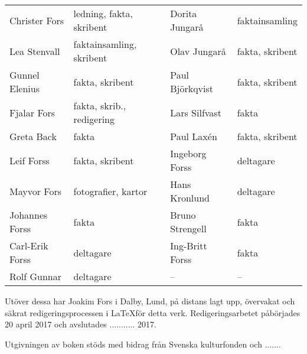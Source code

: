 \begin{center}
  \begin{tabular}{l l l l}
    Christer Fors & ledning, fakta, skribent & Dorita Jungarå & faktainsamling \\
    Lea Stenvall & faktainsamling, skribent & Olav Jungarå & fakta, skribent \\
    Gunnel Elenius & fakta, skribent & Paul Björkqvist & fakta, skribent \\
    Fjalar Fors & fakta, skrib., redigering & Lars Silfvast & fakta \\
    Greta Back & fakta & Paul Laxén & fakta, skribent \\
    Leif Forss & fakta, skribent & Ingeborg Forss & deltagare \\
    Mayvor Fors & fotografier, kartor & Hans Kronlund & deltagare \\
    Johannes Forss & fakta & Bruno Strengell & fakta \\
    Carl-Erik Forss & deltagare & Ing-Britt Forss & fakta \\
    Rolf Gunnar & deltagare & -- & -- \\
  \end{tabular}
\end{center}

Utöver dessa har Joakim Fors i Dalby, Lund, på distans lagt upp, övervakat och säkrat redigeringsprocessen i \LaTeX för detta verk. Redigeringsarbetet påbörjades 20 april 2017 och avslutades ........... 2017.

Utgivningen av boken stöds med bidrag från Svenska kulturfonden och .......
